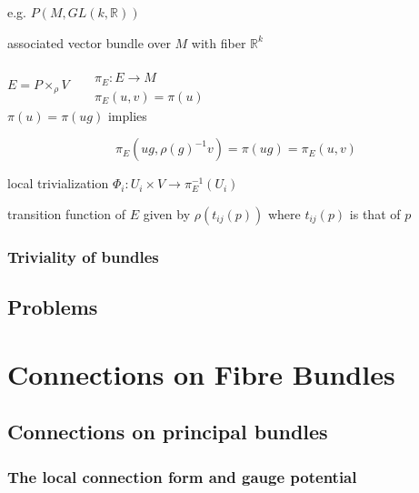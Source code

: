 \documentclass[twoside]{amsart}
\begin{document}
e.g. $P(M,GL(k, \mathbb{R}))$

associated vector bundle over $M$ with fiber $\mathbb{R}^k$

$E = P \times_{\rho} V$ \quad \, $\begin{aligned}
  & \quad \\
  & \pi_E : E \to M \\
  & \pi_E(u,v) = \pi(u) 
\end{aligned}$ \\

$\pi(u) = \pi(ug)$ implies 

\[
\pi_E(ug, \rho(g)^{-1}v) = \pi(ug) = \pi_E(u,v)
\]

local trivialization $\Phi_i : U_i \times V \to \pi^{-1}_E(U_i)$


transition function of $E$ given by $\rho(t_{ij}(p))$ where $t_{ij}(p)$ is that of $p$




\subsubsection{ Triviality of bundles }


\subsection*{ Problems }




\section{Connections on Fibre Bundles}

\subsection{Connections on principal bundles }



\subsubsection{}

\subsubsection{}

\subsubsection{ The local connection form and gauge potential }
\end{document}
